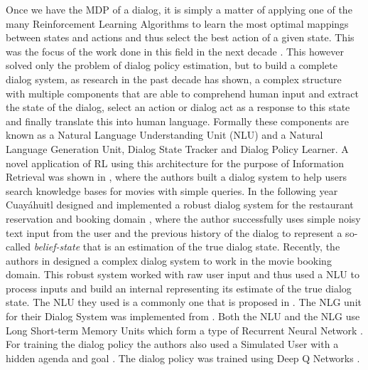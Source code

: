 \documentclass[14pt]{extarticle}
\numberwithin{equation}{section}
\begin{document}
	 Once we have the MDP of a dialog, it is simply a matter of applying one of the many Reinforcement Learning Algorithms to learn the most optimal mappings between states and actions and thus select the best action of a given state. This was the focus of the work done in this field in the next decade \cite{Young99probabilisticmethods}\cite{Singh_mdp}\cite{Pietquin_mdp}. This however solved only the problem of dialog policy estimation, but to build a complete dialog system, as research in the past decade has shown, a complex structure with multiple components that are able to comprehend human input and extract the state of the dialog, select an action or dialog act as a response to this state and finally translate this into human language. Formally these components are known as  a Natural Language Understanding Unit (NLU) and a Natural Language Generation Unit, Dialog State Tracker and Dialog Policy Learner. A novel application of RL using this architecture for the purpose of Information Retrieval was shown in \cite{Dhingra2016EndtoEndRL}, where the authors built a dialog system to help users search knowledge bases for movies with simple queries. In the following year Cuayáhuitl designed and implemented a robust dialog system for the restaurant reservation and booking domain \cite{Cuayhuitl2016SimpleDSAS}, where the author successfully uses simple noisy text input from the user and the previous history of the dialog to represent a so-called \textit{belief-state} that is an estimation of the true dialog state. Recently, the authors in \cite{Li17e2eDS} designed a complex dialog system to work in the movie booking domain. This robust system worked with raw user input and thus used a NLU to process inputs and build an internal  representing its estimate of the true dialog state. The NLU they used is a commonly one that is proposed in \cite{HakkaniTr2016NLU}. The NLG unit for their Dialog System was implemented from \cite{Wen_NLG}. Both the NLU and the NLG use Long Short-term Memory Units which form a type of Recurrent Neural Network \cite{hochreiter1997long}. For training the dialog policy the authors also used a Simulated User with a hidden agenda and goal \cite{Schatzmann_agenda_sim}\cite{Li_user_sim}. The dialog policy was trained using Deep Q Networks \cite{Mnih_DQN}.
\end{document}
